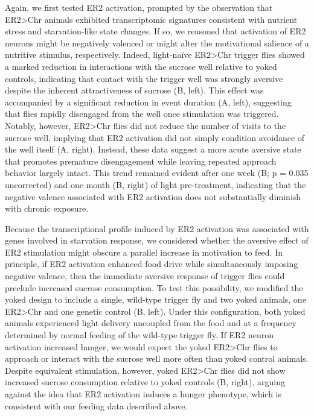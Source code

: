 Again, we first tested ER2 activation, prompted by the observation that ER2>Chr animals exhibited transcriptomic signatures consistent with nutrient stress and starvation-like state changes. 
If so, we reasoned that activation of ER2 neurons might be negatively valenced or might alter the motivational salience of a nutritive stimulus, respectively. 
Indeed, light-naïve ER2>Chr trigger flies showed a marked reduction in interactions with the sucrose well relative to yoked controls, indicating that contact with the trigger well was strongly aversive despite the inherent attractiveness of sucrose (B, left). 
This effect was accompanied by a significant reduction in event duration (A, left), suggesting that flies rapidly disengaged from the well once stimulation was triggered. 
Notably, however, ER2>Chr flies did not reduce the number of visits to the sucrose well, implying that ER2 activation did not simply condition avoidance of the well itself (A, right). 
Instead, these data suggest a more acute aversive state that promotes premature disengagement while leaving repeated approach behavior largely intact. 
This trend remained evident after one week (B; p = 0.035 uncorrected) and one month (B, right) of light pre-treatment, indicating that the negative valence associated with ER2 activation does not substantially diminish with chronic exposure.

Because the transcriptional profile induced by ER2 activation was associated with genes involved in starvation response, we considered whether the aversive effect of ER2 stimulation might obscure a parallel increase in motivation to feed. 
In principle, if ER2 activation enhanced food drive while simultaneously imposing negative valence, then the immediate aversive response of trigger flies could preclude increased sucrose consumption. 
To test this possibility, we modified the yoked design to include a single, wild-type trigger fly and two yoked animals, one ER2>Chr and one genetic control (B, left). 
Under this configuration, both yoked animals experienced light delivery uncoupled from the food and at a frequency determined by normal feeding of the wild-type trigger fly. 
If ER2 neuron activation increased hunger, we would expect the yoked ER2>Chr flies to approach or interact with the sucrose well more often than yoked control animals. 
Despite equivalent stimulation, however, yoked ER2>Chr flies did not show increased sucrose consumption relative to yoked controls (B, right), arguing against the idea that ER2 activation induces a hunger phenotype, which is consistent with our feeding data described above.

